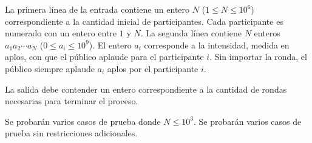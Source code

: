 \documentclass{oci}
\begin{document}
\begin{inputDescription}
La primera línea de la entrada contiene un entero $N$
($1 \leq N \leq 10^6$) correspondiente a la cantidad
inicial de participantes.
%
Cada participante es numerado con un entero entre $1$ y $N$.
%
La segunda línea contiene $N$ enteros $a_1 a_2 \cdots a_N$ ($0 \leq a_i \leq 10^9$).
%
El entero $a_i$ corresponde a la intensidad, medida en aplos, con que el público
aplaude para el participante $i$.
%
Sin importar la ronda, el público siempre aplaude $a_i$ aplos por el participante
$i$.
\end{inputDescription}

\begin{outputDescription}
La salida debe contender un entero correspondiente a la cantidad de rondas
necesarias para terminar el proceso.
\end{outputDescription}

\begin{scoreDescription}
   Se probarán varios casos de prueba donde $N \leq 10^3$.
   Se probarán varios casos de prueba sin restricciones adicionales.
\end{scoreDescription}
\end{document}
